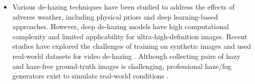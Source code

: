 \documentclass[rnd]{mas_proposal}
\begin{document}
\begin{itemize}

      
      \item Various de-hazing techniques have been studied to address the effects of adverse weather, including physical priors \cite{tan2008visibility, tarel2009fast} and deep learning-based approaches. However, deep de-hazing models have high computational complexity and limited applicability for ultra-high-definition images. Recent studies have explored the challenges of training on synthetic images \cite{chen2021psd} and used real-world datasets for video de-hazing \cite{zhang2021learning}. Although collecting pairs of hazy and haze-free ground-truth images is challenging, professional haze/fog generators exist to simulate real-world conditions \cite{musat2021multi, timofte2018ntire}.


\end{itemize}
\end{document}
